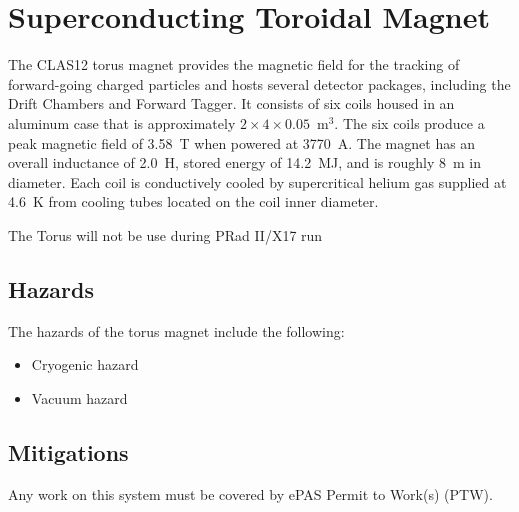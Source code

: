 \section{Superconducting Toroidal Magnet}

The CLAS12 torus magnet provides the magnetic field for the tracking of forward-going
charged particles and hosts several detector packages, including the Drift Chambers 
and Forward Tagger. It consists of six coils housed in an aluminum case that is 
approximately $2 \times 4 \times 0.05$~m$^3$. The six coils produce a peak magnetic field 
of 3.58~T when powered at 3770~A. The magnet has an overall inductance of 2.0~H, stored 
energy of 14.2~MJ, and is roughly 8~m in diameter. Each coil is conductively cooled by 
supercritical helium gas supplied at 4.6~K from cooling tubes located on the coil inner 
diameter.

The Torus will not be use during PRad II/X17 run

\subsection{Hazards} 

The hazards of the torus magnet include the following:

\begin{itemize}
\item Cryogenic hazard
\item Vacuum hazard
\end{itemize}

\subsection{Mitigations}
Any work on this system must be covered by ePAS Permit to Work(s) (PTW).

%

